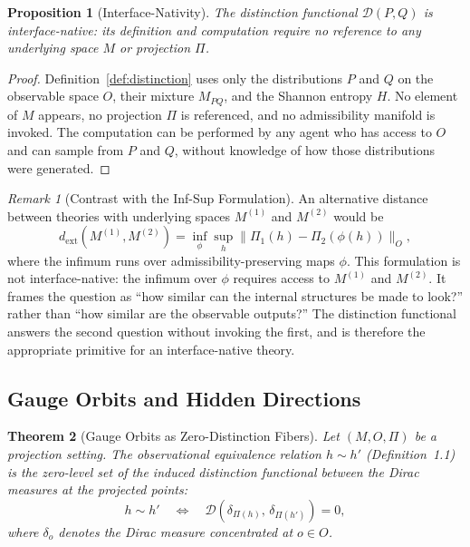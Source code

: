 \documentclass[12pt,a4paper]{article}
\newtheorem{theorem}{Theorem}[section]
\newtheorem{proposition}[theorem]{Proposition}
\theoremstyle{remark}
\newtheorem{remark}{Remark}[section]
\theoremstyle{definition}
\begin{document}
\begin{proposition}[Interface-Nativity]
\label{prop:interface_native}
The distinction functional $\mathcal{D}(P,Q)$ is interface-native: its
definition and computation require no reference to any underlying space
$M$ or projection $\Pi$.
\end{proposition}

\begin{proof}
Definition~\ref{def:distinction} uses only the distributions $P$ and $Q$
on the observable space $O$, their mixture $M_{PQ}$, and the Shannon
entropy $H$. No element of $M$ appears, no projection $\Pi$ is referenced,
and no admissibility manifold is invoked. The computation can be performed
by any agent who has access to $O$ and can sample from $P$ and $Q$,
without knowledge of how those distributions were generated.
\end{proof}

\begin{remark}[Contrast with the Inf-Sup Formulation]
An alternative distance between theories with underlying spaces
$M^{(1)}$ and $M^{(2)}$ would be
\begin{equation}
  d_{\mathrm{ext}}(M^{(1)}, M^{(2)})
  = \inf_\phi \sup_{h} \bigl\|\Pi_1(h) - \Pi_2(\phi(h))\bigr\|_O,
\end{equation}
where the infimum runs over admissibility-preserving maps $\phi$.
This formulation is not interface-native: the infimum over $\phi$
requires access to $M^{(1)}$ and $M^{(2)}$. It frames the question as
``how similar can the internal structures be made to look?'' rather than
``how similar are the observable outputs?'' The distinction functional
answers the second question without invoking the first, and is therefore
the appropriate primitive for an interface-native theory.
\end{remark}

\subsection{Gauge Orbits and Hidden Directions}

\begin{theorem}[Gauge Orbits as Zero-Distinction Fibers]
\label{thm:gauge}
Let $(M, O, \Pi)$ be a projection setting. The observational equivalence
relation $h \sim h'$ (Definition~1.1) is the zero-level set of the
induced distinction functional between the Dirac measures at the projected
points:
\begin{equation}
  h \sim h' \quad\iff\quad
  \mathcal{D}(\delta_{\Pi(h)},\, \delta_{\Pi(h')}) = 0,
\end{equation}
where $\delta_o$ denotes the Dirac measure concentrated at $o \in O$.
\end{theorem}
\end{document}
